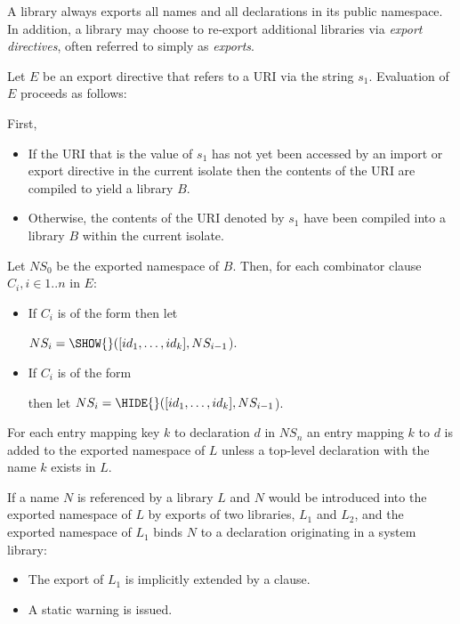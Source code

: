 \documentclass{article}
\begin{document}
\LMHash{}
A library always exports all names and all declarations in its public namespace.
In addition, a library may choose to re-export additional libraries via {\em export directives}, often referred to simply as {\em exports}.

\LMHash{}
Let $E$ be an export directive that refers to a URI via the string $s_1$.
Evaluation of $E$ proceeds as follows:

\LMHash{}
First,

\begin{itemize}
\item
If the URI that is the value of $s_1$ has not yet been accessed by an import or export directive in the current isolate then the contents of the URI are compiled to yield a library $B$.
\item Otherwise, the contents of the URI denoted by $s_1$ have been compiled into a library $B$ within the current isolate.
\end{itemize}

\LMHash{}
Let $NS_0$ be the exported namespace of $B$.
Then, for each combinator clause $C_i, i \in 1 .. n$ in $E$:
\begin{itemize}
\item If $C_i$ is of the form  then let

$NS_i = \SHOW{}([id_1, \ldots, id_k], NS_{i-1}$).
\item If $C_i$ is of the form 

then let $NS_i = \HIDE{}([id_1, \ldots, id_k], NS_{i-1}$).
\end{itemize}

\LMHash{}
For each
entry mapping key $k$ to declaration $d$ in $NS_n$ an entry mapping $k$ to $d$ is added to the exported namespace of $L$ unless a top-level declaration with the name $k$ exists in $L$.

\LMHash{}
If a name $N$ is referenced by a library $L$ and $N$ would be introduced into the exported namespace of $L$ by exports of two libraries, $L_1$ and $L_2$, and the exported namespace of $L_1$ binds $N$ to a declaration originating in a system library:
\begin{itemize}
\item The export of $L_1$ is implicitly extended by a  clause.
\item A static warning is issued.
\end{itemize}
\end{document}
